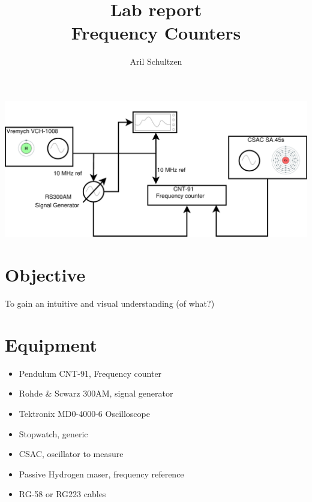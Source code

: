 \documentclass[11pt,english,a4paper]{article}
\title{Lab report \\ Frequency Counters}
\author{Aril Schultzen}
\begin{document}
\maketitle
\includegraphics[width=1 \textwidth]{lab_report_diagram.pdf}
\section{Objective}
To gain an intuitive and visual understanding (of what?)

\section{Equipment}
\begin{itemize}
  \item Pendulum CNT-91, Frequency counter
  \item Rohde \& Scwarz 300AM, signal generator
  \item Tektronix MD0-4000-6 Oscilloscope
  \item Stopwatch, generic
  \item CSAC, oscillator to measure
  \item Passive Hydrogen maser, frequency reference
  \item RG-58 or RG223 cables
\end{itemize}
\end{document}
